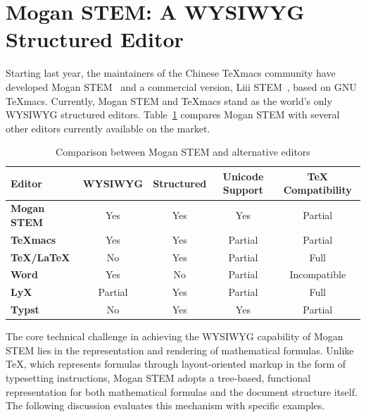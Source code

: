 \section{Mogan STEM: A WYSIWYG Structured Editor}
\label{sec:mogan}

Starting last year, the maintainers of the Chinese TeXmacs community have developed Mogan STEM~\cite{moganstem2025} and a commercial version, Liii STEM~\cite{liiistem2025}, based on GNU TeXmacs. Currently, Mogan STEM and TeXmacs stand as the world's only WYSIWYG structured editors. Table~\ref{tab:mogan-vs-other} compares Mogan STEM with several other editors currently available on the market.

\begin{table}[htbp]
    \centering
    \caption{Comparison between Mogan STEM and alternative editors}
    \label{tab:mogan-vs-other}
    \begin{tabular}{lcccc}
        \toprule
        \textbf{Editor}     & \textbf{WYSIWYG} & \textbf{Structured} & \textbf{Unicode Support} & \textbf{\TeX{} Compatibility} \\
        \midrule
        \textbf{Mogan STEM\cite{moganstem2025}} & Yes              & Yes                 & Yes                      & Partial                       \\
        \textbf{TeXmacs\cite{van_der_hoeven_gnu_2001}}    & Yes              & Yes                 & Partial                  & Partial                       \\
        \textbf{TeX/LaTeX\cite{lamport1994document}}  & No               & Yes                 & Partial                  & Full                          \\
        \textbf{Word}       & Yes              & No                  & Partial                  & Incompatible                  \\
        \textbf{LyX\cite{jackson2001lyx}}        & Partial          & Yes                 & Partial                  & Full                          \\
        \textbf{Typst\cite{madje2023typst}}      & No               & Yes                 & Yes                      & Partial                       \\
        \bottomrule
    \end{tabular}
\end{table}

The core technical challenge in achieving the WYSIWYG capability of Mogan STEM lies in the representation and rendering of mathematical formulas. Unlike \TeX{}, which represents formulas through layout-oriented markup in the form of typesetting instructions, Mogan STEM adopts a tree-based, functional representation for both mathematical formulas and the document structure itself. The following discussion evaluates this mechanism with specific examples.

